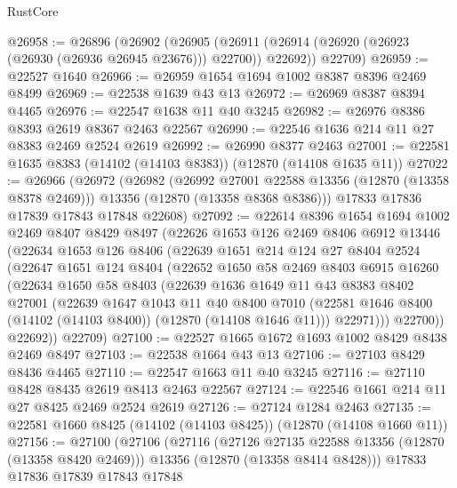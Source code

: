 \begin{lexlean}{RustCore}
\begin{coremodule}
@26958 := @26896
    (@26902
      (@26905 (@26911 (@26914 (@26920 (@26923 (@26930 (@26936 @26945 @23676))) @22700)) @22692))
      @22709)
@26959 := @22527 @1640
@26966 := @26959 @1654 @1694 @1002 @8387 @8396 @2469 @8499
@26969 := @22538 @1639 @43 @13
@26972 := @26969 @8387 @8394 @4465
@26976 := @22547 @1638 @11 @40 @3245
@26982 := @26976 @8386 @8393 @2619 @8367 @2463 @22567
@26990 := @22546 @1636 @214 @11 @27 @8383 @2469 @2524 @2619
@26992 := @26990 @8377 @2463
@27001 := @22581 @1635 @8383 (@14102 (@14103 @8383)) (@12870 (@14108 @1635 @11))
@27022 := @26966
    (@26972
      (@26982
        (@26992 @27001 @22588 @13356 (@12870 (@13358 @8378 @2469)))
        @13356
        (@12870 (@13358 @8368 @8386)))
      @17833
      @17836
      @17839
      @17843
      @17848
      @22608)
@27092 := @22614
    @8396
    @1654
    @1694
    @1002
    @2469
    @8407
    @8429
    @8497
    (@22626
      @1653
      @126
      @2469
      @8406
      @6912
      @13446
      (@22634
        @1653
        @126
        @8406
        (@22639
          @1651
          @214
          @124
          @27
          @8404
          @2524
          (@22647
            @1651
            @124
            @8404
            (@22652
              @1650
              @58
              @2469
              @8403
              @6915
              @16260
              (@22634
                @1650
                @58
                @8403
                (@22639
                  @1636
                  @1649
                  @11
                  @43
                  @8383
                  @8402
                  @27001
                  (@22639
                    @1647
                    @1043
                    @11
                    @40
                    @8400
                    @7010
                    (@22581 @1646 @8400 (@14102 (@14103 @8400)) (@12870 (@14108 @1646 @11)))
                    @22971)))
              @22700))
          @22692))
      @22709)
@27100 := @22527 @1665 @1672 @1693 @1002 @8429 @8438 @2469 @8497
@27103 := @22538 @1664 @43 @13
@27106 := @27103 @8429 @8436 @4465
@27110 := @22547 @1663 @11 @40 @3245
@27116 := @27110 @8428 @8435 @2619 @8413 @2463 @22567
@27124 := @22546 @1661 @214 @11 @27 @8425 @2469 @2524 @2619
@27126 := @27124 @1284 @2463
@27135 := @22581 @1660 @8425 (@14102 (@14103 @8425)) (@12870 (@14108 @1660 @11))
@27156 := @27100
    (@27106
      (@27116
        (@27126 @27135 @22588 @13356 (@12870 (@13358 @8420 @2469)))
        @13356
        (@12870 (@13358 @8414 @8428)))
      @17833
      @17836
      @17839
      @17843
      @17848

\end{coremodule}
\end{lexlean}
